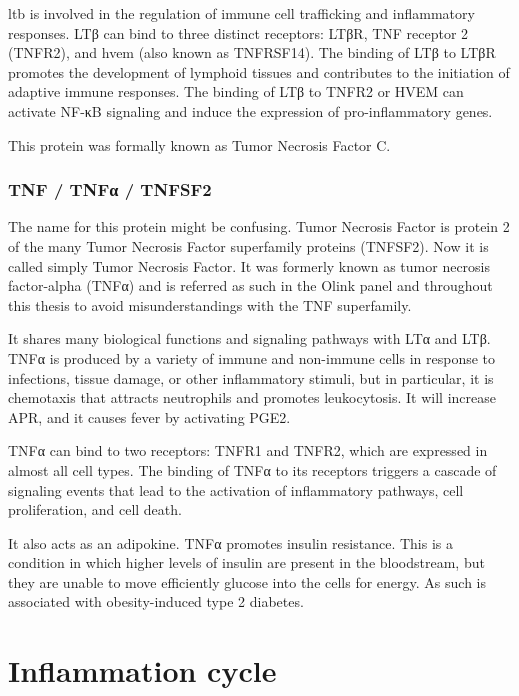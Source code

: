 \gls{ltb} is involved in the regulation of immune cell trafficking and inflammatory responses. LTβ can bind to three distinct receptors: LTβR, TNF receptor 2 (TNFR2), and \gls{hvem} (also known as TNFRSF14). The binding of LTβ to LTβR promotes the development of lymphoid tissues and contributes to the initiation of adaptive immune responses. The binding of LTβ to TNFR2 or HVEM can activate NF-κB signaling and induce the expression of pro-inflammatory genes.

This protein was formally known as Tumor Necrosis Factor C.

\subsubsection{TNF / TNFα / TNFSF2}
\label{inf:tnfa}

The name for this protein might be confusing. Tumor Necrosis Factor is protein 2 of the many Tumor Necrosis Factor superfamily proteins (TNFSF2). Now it is called simply Tumor Necrosis Factor. It was formerly known as tumor necrosis factor-alpha (TNFα) and is referred as such in the Olink panel and throughout this thesis to avoid misunderstandings with the TNF superfamily.

It shares many biological functions and signaling pathways with LTα and LTβ. TNFα is produced by a variety of immune and non-immune cells in response to infections, tissue damage, or other inflammatory stimuli, but in particular, it is chemotaxis that attracts neutrophils and promotes leukocytosis. It will increase APR, and it causes fever by activating PGE2.

TNFα can bind to two receptors: TNFR1 and TNFR2, which are expressed in almost all cell types. The binding of TNFα to its receptors triggers a cascade of signaling events that lead to the activation of inflammatory pathways, cell proliferation, and cell death.

It also acts as an adipokine. TNFα promotes insulin resistance. This is a condition in which higher levels of insulin are present in the bloodstream, but they are unable to move efficiently glucose into the cells for energy. As such is associated with obesity-induced type 2 diabetes.


\section{Inflammation cycle}
\label{in:cycle}

